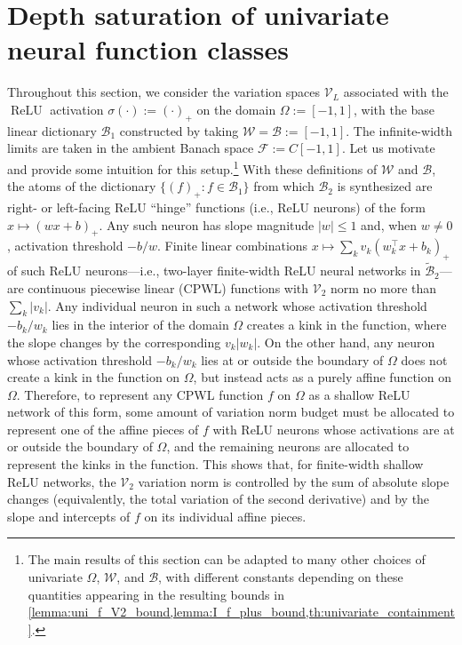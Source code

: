 \documentclass{article}
\DeclareMathOperator{\ReLU}{\mathrm{ReLU}}
\def\cB{{\mathcal{B}}}
\def\cF{{\mathcal{F}}}
\def\cV{{\mathcal{V}}}
\def\cW{{\mathcal{W}}}
\begin{document}
\section{Depth saturation of univariate neural function classes} \label{sec:uni_depth_saturation}


Throughout this section, we consider the variation spaces $\cV_L$ associated with the $\ReLU$ activation $\sigma(\cdot):= (\cdot)_+$ on the domain $\Omega := [-1,1]$, with the base linear dictionary $\cB_1$ constructed by taking $\cW = \cB := [-1,1]$. The infinite-width limits are taken in the ambient Banach space $\cF := C[-1,1]$. Let us motivate and provide some intuition for this setup.\footnote{The main results of this section can be adapted to many other choices of univariate $\Omega$, $\cW$, and $\cB$, with different constants depending on these quantities appearing in the resulting bounds in \cref{lemma:uni_f_V2_bound,lemma:I_f_plus_bound,th:univariate_containment}.} With these definitions of $\cW$ and $\cB$, the atoms of the dictionary $\{ (f)_+: f \in \cB_1 \} $ from which $\cB_2$ is synthesized are right- or left-facing ReLU ``hinge'' functions (i.e., ReLU neurons) of the form $x \mapsto (wx+b)_+$. Any such neuron has slope magnitude $|w| \leq 1$ and, when $w \neq 0$, activation threshold $-b/w$. Finite linear combinations $x \mapsto \sum_k v_k (w_k^\top x + b_k)_+$ of such ReLU neurons---i.e., two-layer finite-width ReLU neural networks in $\widetilde{\cB}_2$---are continuous piecewise linear (CPWL) functions with $\cV_2$ norm no more than $\sum_k |v_k|$. Any individual neuron in such a network whose activation threshold $-b_k/w_k$ lies in the interior of the domain $\Omega$ creates a kink in the function, where the slope changes by the corresponding $v_k |w_k|$. On the other hand, any neuron whose activation threshold $-b_k/w_k$ lies at or outside the boundary of $\Omega$ does not create a kink in the function on $\Omega$, but instead acts as a purely affine function on $\Omega$. Therefore, to represent any CPWL function $f$ on $\Omega$ as a shallow ReLU network of this form, some amount of variation norm budget must be allocated to represent one of the affine pieces of $f$ with ReLU neurons whose activations are at or outside the boundary of $\Omega$, and the remaining neurons are allocated to represent the kinks in the function. This shows that, for finite-width shallow ReLU networks, the $\cV_2$ variation norm is controlled by the sum of absolute slope changes (equivalently, the total variation of the second derivative) and by the slope and intercepts of $f$ on its individual affine pieces. 
\end{document}
